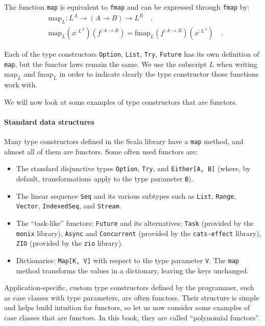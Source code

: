The function \lstinline!map! is equivalent to \lstinline!fmap! and
can be expressed through \lstinline!fmap! by:
\begin{align*}
 & \text{map}_{L}:L^{A}\rightarrow\left(A\rightarrow B\right)\rightarrow L^{B}\quad,\\
 & \text{map}_{L}(x^{:L^{A}})(f^{:A\rightarrow B})=\text{fmap}_{L}(f^{:A\rightarrow B})(x^{:L^{A}})\quad.
\end{align*}

Each of the type constructors \lstinline!Option!, \lstinline!List!,
\lstinline!Try!, \lstinline!Future! has its own definition of \lstinline!map!,
but the functor laws remain the same. We use the subscript $L$ when
writing $\text{map}_{L}$ and $\text{fmap}_{L}$ in order to indicate
clearly the type constructor those functions work with.

We will now look at some examples of type constructors that are functors.

\paragraph{Standard data structures}

Many type constructors defined in the Scala library have a \lstinline!map!
method, and almost all of them are functors. Some often used functors
are:
\begin{itemize}
\item The standard disjunctive types \lstinline!Option!, \lstinline!Try!,
and \lstinline!Either[A, B]! (where, by default, transformations
apply to the type parameter \lstinline!B!).
\item The linear sequence \lstinline!Seq! and its various subtypes such
as \lstinline!List!, \lstinline!Range!, \lstinline!Vector!, \lstinline!IndexedSeq!,
and \lstinline!Stream!.
\item The \textsf{``}task-like\textsf{''} functors: \lstinline!Future! and its alternatives:
\lstinline!Task! (provided by the \texttt{monix} library), \lstinline!Async!
and \lstinline!Concurrent! (provided by the \texttt{cats-effect}
library), \lstinline!ZIO! (provided by the \texttt{zio} library).
\item Dictionaries: \lstinline!Map[K, V]! with respect to the type parameter
\lstinline!V!. The \lstinline!map! method transforms the values
in a dictionary, leaving the keys unchanged.
\end{itemize}
Application-specific, custom type constructors defined by the programmer,
such as case classes with type parameters, are often functors. Their
structure is simple and helps build intuition for functors, so let
us now consider some examples of case classes that are functors. In
this book, they are called \textsf{``}polynomial functors\textsf{''}.

